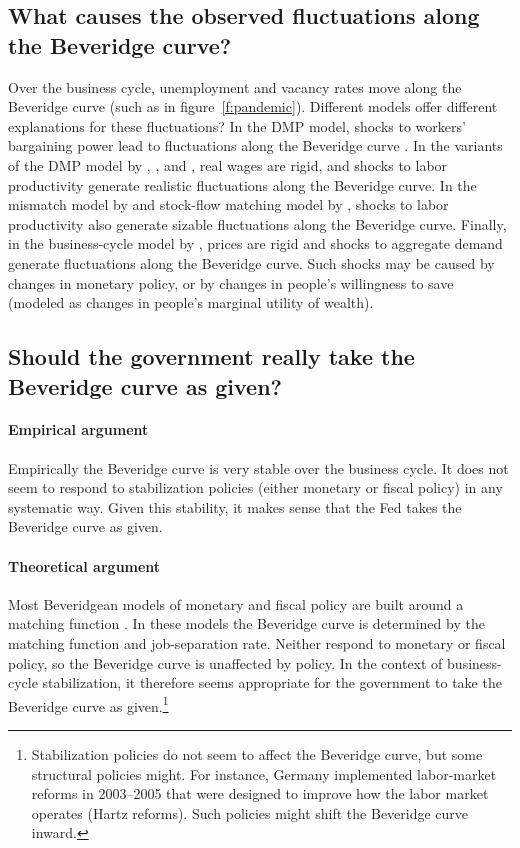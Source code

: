 \documentclass[letterpaper,12pt,leqno]{article}
\begin{document}
\subsection{What causes the observed fluctuations along the Beveridge curve?} 

Over the business cycle, unemployment and vacancy rates move along the Beveridge curve (such as in figure~\ref{f:pandemic}). Different models offer different explanations for these fluctuations? In the DMP model, shocks to workers' bargaining power lead to fluctuations along the Beveridge curve \citep[table~6]{S05}. In the variants of the DMP model by \citet{H05}, \citet{HM08}, and \citet{M09}, real wages are rigid, and shocks to labor productivity generate realistic fluctuations along the Beveridge curve. In the mismatch model by \citet{S07} and stock-flow matching model by \citet{ES10}, shocks to labor productivity also generate sizable fluctuations along the Beveridge curve. Finally, in the business-cycle model by \citet{MS19}, prices are rigid and shocks to aggregate demand generate fluctuations along the Beveridge curve. Such shocks may be caused by changes in monetary policy, or by changes in people's willingness to save (modeled as changes in people's marginal utility of wealth).

\subsection{Should the government really take the Beveridge curve as given?}

\paragraph{Empirical argument} Empirically the Beveridge curve is very stable over the business cycle. It does not seem to respond to stabilization policies (either monetary or fiscal policy) in any systematic way. Given this stability, it makes sense that the Fed takes the Beveridge curve as given. 

\paragraph{Theoretical argument} Most Beveridgean models of monetary and fiscal policy are built around a matching function \citep{W05,BG08,RW11,M12,MS15,MS19}. In these models the Beveridge curve is determined by the matching function and job-separation rate. Neither respond to monetary or fiscal policy, so the Beveridge curve is unaffected by policy. In the context of business-cycle stabilization, it therefore seems appropriate for the government to take the Beveridge curve as given.\footnote{Stabilization policies do not seem to affect the Beveridge curve, but some structural policies might. For instance, Germany implemented labor-market reforms in 2003--2005 that were designed to improve how the labor market operates (Hartz reforms). Such policies might shift the Beveridge curve inward.}
\end{document}
